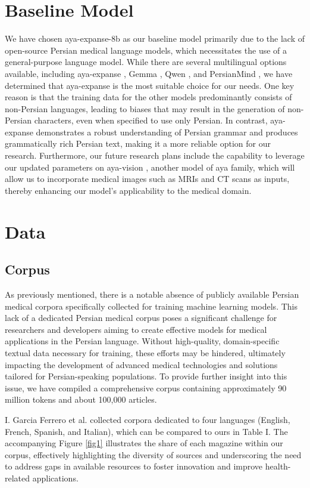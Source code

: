 \documentclass[conference]{IEEEtran}
\begin{document}
	\section{Baseline Model}
	We have chosen aya-expanse-8b as our baseline model primarily due to the lack of open-source Persian medical language models, which necessitates the use of a general-purpose language model. While there are several multilingual options available, including aya-expanse \cite{b5}, Gemma \cite{b14}, Qwen \cite{b15}, and PersianMind \cite{b16}, we have determined that aya-expanse is the most suitable choice for our needs. One key reason is that the training data for the other models predominantly consists of non-Persian languages, leading to biases that may result in the generation of non-Persian characters, even when specified to use only Persian. In contrast, aya-expanse demonstrates a robust understanding of Persian grammar and produces grammatically rich Persian text, making it a more reliable option for our research. Furthermore, our future research plans include the capability to leverage our updated parameters on aya-vision
	\cite{b17}
	, another model of aya family, which will allow us to incorporate medical images such as MRIs and CT scans as inputs, thereby enhancing our model’s applicability to the medical domain.
	\section{Data}
	
	\subsection{Corpus}
	As previously mentioned, there is a notable absence of publicly available Persian medical corpora specifically collected for training machine learning models. This lack of a dedicated Persian medical corpus poses a significant challenge for researchers and developers aiming to create effective models for medical applications in the Persian language. Without high-quality, domain-specific textual data necessary for training, these efforts may be hindered, ultimately impacting the development of advanced medical technologies and solutions tailored for Persian-speaking populations. To provide further insight into this issue, we have compiled a comprehensive corpus containing approximately 90 million tokens and about 100,000 articles. 
	
	I. Garcia Ferrero et al.
	\cite{b18}
	collected corpora dedicated to four languages (English, French, Spanish, and Italian), which can be compared to ours in Table I. The accompanying Figure \ref{fig1} illustrates the share of each magazine within our corpus, effectively highlighting the diversity of sources and underscoring the need to address gaps in available resources to foster innovation and improve health-related applications.
	
\end{document}
